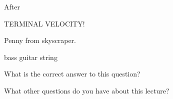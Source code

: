 \documentclass{ximera}
\begin{document}
After 


TERMINAL VELOCITY!


Penny from skyscraper. 


bass guitar string


\begin{question}
  What is the correct answer to this question?

  \begin{solution}
    \begin{multiple-choice}
    \end{multiple-choice}  
  \end{solution}
\end{question}

What other questions do you have about this lecture?
\begin{free-response}
\end{free-response}
\end{document}
